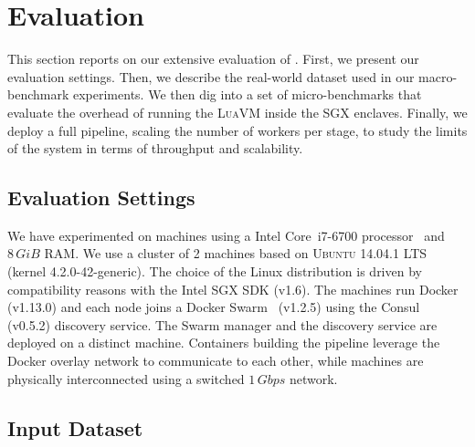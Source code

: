 \section{Evaluation}\label{sec:eval}

This section reports on our extensive evaluation of \SYS{}.
First, we present our evaluation settings.
Then, we describe the real-world dataset used in our macro-benchmark experiments.
We then dig into a set of micro-benchmarks that evaluate the overhead of running the \textsc{LuaVM} inside the SGX enclaves.
Finally, we deploy a full \SYS{} pipeline, scaling the number of workers per stage, to study the limits of the system in terms of throughput and scalability.


\subsection{Evaluation Settings}

We have experimented on machines using a Intel{\textregistered} Core\texttrademark~i7-6700 processor~\cite{intel:i7_6700} and $8\,GiB$ RAM.
We use a cluster of 2 machines based on \textsc{Ubuntu} 14.04.1 LTS (kernel 4.2.0-42-generic).
The choice of the Linux distribution is driven by compatibility reasons with the Intel{\textregistered} SGX SDK (v1.6).
The machines run Docker (v1.13.0) and each node joins a Docker Swarm~\cite{docker:swarm_2016} (v1.2.5) using the Consul~\cite{consul} (v0.5.2) discovery service.
The Swarm manager and the discovery service are deployed on a distinct machine.
Containers building the pipeline leverage the Docker overlay network to communicate to each other, while machines are physically interconnected using a switched $1\,Gbps$ network.



\subsection{Input Dataset}

